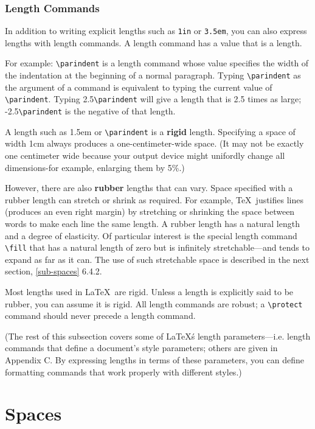 \documentclass{article}
\newcommand{\justtext}[1]{\texttt{\textbackslash #1}}
\begin{document}
\subsubsection{Length Commands}

In addition to writing explicit lengths such as {\tt 1in} or {\tt 3.5em}, you can also express
lengths with length commands. A length command has a value that is a length. 

For example: \justtext{parindent} is a length command whose value specifies the width of the
indentation at the beginning of a normal paragraph. Typing \justtext{parindent} as the argument of
a command is equivalent to typing the current value of \justtext{parindent}. Typing 2.5\justtext
{parindent} will give a length that is 2.5 times as large; -2.5\justtext{parindent} is the negative
of that length.

A length such as 1.5em or \justtext{parindent} is a \textbf{rigid} length. Specifying a space of
width 1cm always produces a one-centimeter-wide space. (It may not be exactly one centimeter wide
because your output device might unifordly change all dimensions-for example, enlarging them by
5\%.) 

However, there are also \textbf{rubber} lengths that can vary. Space specified with a rubber length can stretch or shrink as required. For example, \TeX\ justifies lines (produces an even right margin) by stretching or shrinking the space between words to make each line the same length. A rubber length has a natural length and a degree of elasticity. Of particular interest is the special length command \justtext{fill} that has a natural length of zero but is infinitely stretchable---and tends to expand as far as it can. The use of such stretchable space is described in the next section, \ref{sub-spaces} 6.4.2. 

Most lengths used in \LaTeX\ are rigid. Unless a length is explicitly said to be rubber, you can assume it is rigid. All length commands are robust; a \justtext{protect} command should never precede a length command.

(The rest of this subsection covers some of \LaTeX\'s length parameters---i.e. length commands that define a document's style parameters; others are given in Appendix C. By expressing lengths in terms of these parameters, you can define formatting commands that work properly with different styles.)


\section{Spaces}\label{spaces}
\end{document}
